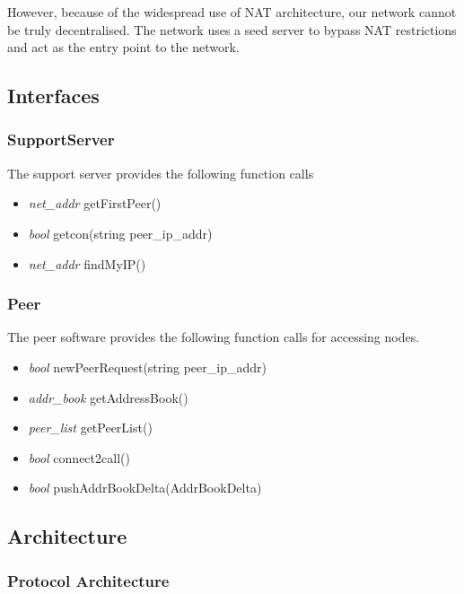 \documentclass[a4paper,11pt]{article}
\begin{document}
However, because of the widespread use of NAT architecture, our network cannot be truly decentralised. The network uses a seed server to bypass NAT restrictions and act as the entry point to the network.


\subsection{Interfaces}
\subsubsection{SupportServer}
The support server provides the following function calls
\begin{itemize}
\item \emph{net\_addr} getFirstPeer()
\item \emph{bool} getcon(string peer\_ip\_addr)
\item \emph{net\_addr} findMyIP()
\end{itemize}

\subsubsection{Peer}
The peer software provides the following function calls for accessing nodes.
\begin{itemize}
\item \emph{bool} newPeerRequest(string peer\_ip\_addr)
\item \emph{addr\_book} getAddressBook()
\item \emph{peer\_list} getPeerList()
\item \emph{bool} connect2call()
  \item \emph{bool} pushAddrBookDelta(AddrBookDelta)
\end{itemize}

\subsection{Architecture}

\subsubsection{Protocol Architecture}
\end{document}
